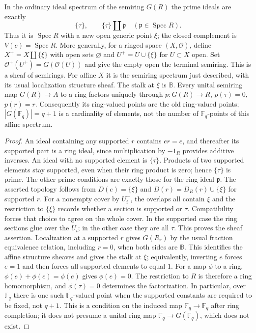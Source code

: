 \begin{proposition}
\label{AC-G10}
In the ordinary ideal spectrum of the semiring $G(R)$ the prime ideals
are exactly
\[
 \{\tau\},\qquad \{\tau\}\amalg\mathfrak p\quad
 (\mathfrak p\in\operatorname{Spec}R).
\]
Thus it is $\operatorname{Spec}R$ with a new open generic point $\xi$;
the closed complement is $V(e)=\operatorname{Spec}R$.
More generally, for a ringed space $(X,\mathcal O)$, define $X^+=X\amalg\{\xi\}$
with open sets $\varnothing$ and $U^+=U\cup\{\xi\}$ for $U\subset X$
open.  Set $\mathcal O^+(U^+)=G(\mathcal O(U))$ and give the empty open
the terminal semiring.  This is a sheaf of semirings.  For affine $X$
it is the semiring spectrum just described, with its usual localization
structure sheaf.  The stalk at $\xi$ is $\mathbb B$.
Every unital semiring map $G(R)\to A$ to a ring factors uniquely through
$p:G(R)\to R$, $p(\tau)=0$, $p(r)=r$.
Consequently its ring-valued points are the old ring-valued points;
$|G(\mathbb F_q)|=q+1$ is a cardinality of elements, not the number of
$\mathbb F_q$-points of this affine spectrum.
\end{proposition}
\begin{proof}
An ideal containing any supported $r$ contains $er=e$, and thereafter
its supported part is a ring ideal, since multiplication by $-1_R$
provides additive inverses.  An ideal with no supported element is
$\{\tau\}$.  Products of two supported elements stay supported, even
when their ring product is zero; hence $\{\tau\}$ is prime.  The other
prime conditions are exactly those for the ring ideal $\mathfrak p$.
The asserted topology follows from $D(e)=\{\xi\}$ and
$D(r)=D_R(r)\cup\{\xi\}$ for supported $r$.
For a nonempty cover by $U_i^+$, the overlaps all contain $\xi$ and the
restriction to $\{\xi\}$ records whether a section is supported or
$\tau$.  Compatibility forces that choice to agree on the whole cover.
In the supported case the ring sections glue over the $U_i$; in the
other case they are all $\tau$.  This proves the sheaf assertion.
Localization at a supported $r$ gives $G(R_r)$ by the usual fraction
equivalence relation, including $r=0$, when both sides are $\mathbb B$.
This identifies the affine structure sheaves and gives the stalk at
$\xi$; equivalently, inverting $e$ forces $e=1$ and then forces all
supported elements to equal $1$.
For a map $\phi$ to a ring, $\phi(e)+\phi(e)=\phi(e)$ gives $\phi(e)=0$.
The restriction to $R$ is therefore a ring homomorphism, and
$\phi(\tau)=0$ determines the factorization.  In particular, over
$\mathbb F_q$ there is one such $\mathbb F_q$-valued point when the
supported constants are required to be fixed, not $q+1$.  This is a
condition on the induced map $\mathbb F_q\to\mathbb F_q$ after ring
completion; it does not presume a unital ring map
$\mathbb F_q\to G(\mathbb F_q)$, which does not exist.
\end{proof}

